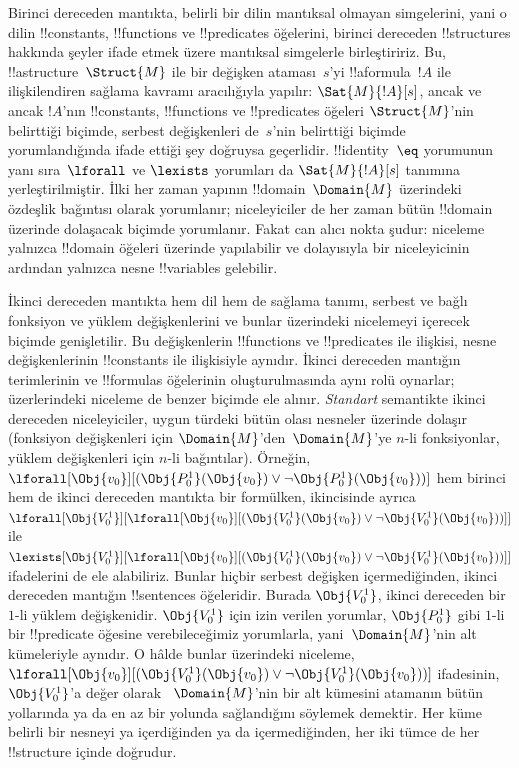 \documentclass[../../../include/open-logic-section]{subfiles}
\begin{document}


Birinci dereceden mantıkta, belirli bir dilin mantıksal olmayan simgelerini,
yani o dilin !!{constant}s, !!{function}s ve !!{predicate}s öğelerini,
birinci dereceden !!{structure}s hakkında şeyler ifade etmek üzere mantıksal
simgelerle birleştiririz. Bu, !!a{structure}~$\Struct{M}$ ile bir değişken
ataması~$s$'yi !!a{formula}~$!A$ ile ilişkilendiren sağlama kavramı
aracılığıyla yapılır: $\Sat{M}{!A}[s]$, ancak ve ancak $!A$'nın
!!{constant}s, !!{function}s ve !!{predicate}s öğeleri $\Struct{M}$'nin
belirttiği biçimde, serbest değişkenleri de~$s$'nin belirttiği biçimde
yorumlandığında ifade ettiği şey doğruysa geçerlidir. !!{identity}~$\eq$
yorumunun yanı sıra~$\lforall$ ve $\lexists$ yorumları da
$\Sat{M}{!A}[s]$ tanımına yerleştirilmiştir. İlki her zaman yapının
!!{domain}~$\Domain{M}$ üzerindeki özdeşlik bağıntısı olarak yorumlanır;
niceleyiciler de her zaman bütün !!{domain} üzerinde dolaşacak biçimde
yorumlanır. Fakat can alıcı nokta şudur: niceleme yalnızca !!{domain}
öğeleri üzerinde yapılabilir ve dolayısıyla bir niceleyicinin ardından
yalnızca nesne !!{variable}s gelebilir.

İkinci dereceden mantıkta hem dil hem de sağlama tanımı, serbest ve bağlı
fonksiyon ve yüklem değişkenlerini ve bunlar üzerindeki nicelemeyi içerecek
biçimde genişletilir. Bu değişkenlerin !!{function}s ve !!{predicate}s ile
ilişkisi, nesne değişkenlerinin !!{constant}s ile ilişkisiyle aynıdır.
İkinci dereceden mantığın terimlerinin ve !!{formula}s öğelerinin
oluşturulmasında aynı rolü oynarlar; üzerlerindeki niceleme de benzer biçimde
ele alınır. \emph{Standart} semantikte ikinci dereceden niceleyiciler, uygun
türdeki bütün olası nesneler üzerinde dolaşır (fonksiyon değişkenleri için
$\Domain{M}$'den~$\Domain{M}$'ye $n$-li fonksiyonlar, yüklem değişkenleri
için $n$-li bağıntılar). Örneğin,
$\lforall[\Obj{v_0}][(\Obj{P^1_0}(\Obj{v_0}) \lor \lnot
  \Obj{P^1_0}(\Obj{v_0}))]$ hem birinci hem de ikinci dereceden mantıkta bir
formülken, ikincisinde ayrıca
$\lforall[\Obj{V^1_0}][\lforall[\Obj{v_0}][(\Obj{V^1_0}(\Obj{v_0}) \lor
    \lnot \Obj{V^1_0}(\Obj{v_0}))]]$ ile
$\lexists[\Obj{V^1_0}][\lforall[\Obj{v_0}][(\Obj{V^1_0}(\Obj{v_0}) \lor
    \lnot \Obj{V^1_0}(\Obj{v_0}))]]$ ifadelerini de ele alabiliriz. Bunlar
hiçbir serbest değişken içermediğinden, ikinci dereceden mantığın
!!{sentence}s öğeleridir. Burada $\Obj{V^1_0}$, ikinci dereceden bir $1$-li
yüklem değişkenidir. $\Obj{V^1_0}$ için izin verilen yorumlar,
$\Obj{P^1_0}$ gibi $1$-li bir !!{predicate} öğesine verebileceğimiz yorumlarla,
yani~$\Domain{M}$'nin alt kümeleriyle aynıdır. O hâlde bunlar üzerindeki
niceleme,
$\lforall[\Obj{v_0}][(\Obj{V^1_0}(\Obj{v_0}) \lor \lnot
  \Obj{V^1_0}(\Obj{v_0}))]$ ifadesinin, $\Obj{V^1_0}$'a değer olarak
~$\Domain{M}$'nin bir alt kümesini atamanın bütün yollarında ya da en az bir
yolunda sağlandığını söylemek demektir. Her küme belirli bir nesneyi ya
içerdiğinden ya da içermediğinden, her iki tümce de her !!{structure}
içinde doğrudur.
\end{document}
